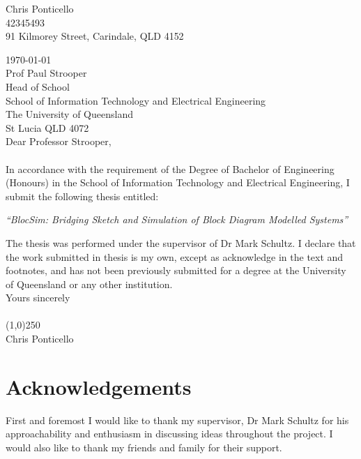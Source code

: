 
\begin{flushright}
Chris Ponticello\\ 42345493\\ 91 Kilmorey Street, Carindale, QLD 4152\\
\end{flushright}

\noindent \today \\

\noindent Prof Paul Strooper\\
Head of School\\
School of Information Technology and Electrical Engineering\\
The University of  Queensland\\
St Lucia QLD 4072\\

\noindent Dear Professor Strooper,\\ \\
In accordance with the requirement of the Degree of Bachelor of Engineering (Honours) in the School
of Information Technology and Electrical Engineering, I submit the following thesis entitled:

\begin{center}
  \emph{``BlocSim: Bridging Sketch and Simulation of Block Diagram Modelled Systems''}
\end{center}

\noindent The thesis was performed under the supervisor of Dr Mark Schultz. I declare that the work
submitted in thesis is my own, except as acknowledge in the text and footnotes, and has not been
previously submitted for a degree at the University of Queensland or any other institution. \\

\noindent Yours sincerely \\ \\ 

\noindent \line(1,0){250} \\

\noindent Chris Ponticello


\chapter{Acknowledgements}

First and foremost I would like to thank my supervisor, Dr Mark Schultz for his approachability and enthusiasm in discussing ideas throughout the project. I would also like to thank my friends and family for their support. 
\\

